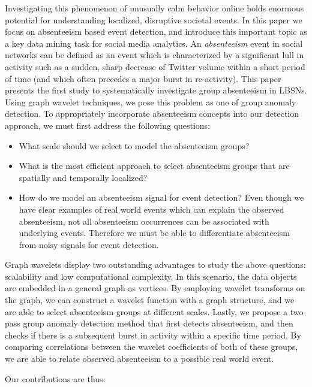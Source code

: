 Investigating this phenomenon of unusually calm behavior online holds enormous potential for understanding localized, disruptive societal events.
In this paper we focus on absenteeism based event detection, and introduce this important topic as a key data mining
task for social media analytics.
An \textit{absenteeism} event in social networks can be defined as an event which is characterized by a significant lull in activity such as a sudden, sharp decrease of Twitter volume within a short period of time (and which  often precedes a major burst in re-activity).
This paper presents the first study to systematically investigate group absenteeism in LBSNs.
Using graph wavelet techniques, we pose this problem as one of group anomaly detection.
To appropriately incorporate absenteeism concepts into our detection approach, we must first address the following questions:

\begin{itemize}
\item What scale should we select to model the absenteeism groups? %

\item What is the most efficient approach to select absenteeism groups that are spatially and temporally localized?

\item How do we model an absenteeism signal for event detection? Even though we have clear examples of real world events which can explain the observed absenteeism, not all absenteeism occurrences can be associated with underlying events. Therefore we must be able to differentiate absenteeism from noisy signals for event detection.
\end{itemize}

Graph wavelets display two outstanding advantages to study the above
questions: scalability and low computational complexity.
In this scenario, the data objects are embedded in a general graph as vertices.
By employing wavelet transforms on the graph, we can construct a wavelet function with a graph structure, and we are able to select absenteeism groups at different scales.
Lastly, we propose a two-pass group anomaly detection method that first detects absenteeism, and then checks if there is a subsequent burst in activity within a specific time period.
By comparing correlations between the wavelet coefficients of both of these groups, we are able to relate observed absenteeism to a possible real world event.

Our contributions are thus:

